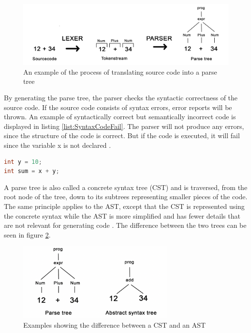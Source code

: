 \begin{figure}[H] 
    \begin{center}
        \includegraphics[width=1\textwidth]{Files/Billeder: Impl/parsing kopier.jpg}
    \end{center}
    \caption{An example of the process of translating source code into a parse tree}
    \label{I:Figure:ParsetreProcess}
\end{figure}

\noindent
By generating the parse tree, the parser checks the syntactic correctness of the source code. If the source code consists of syntax errors, error reports will be thrown. An example of syntactically correct but semantically incorrect code is displayed in listing \ref{list:SyntaxCodeFail}. The parser will not produce any errors, since the structure of the code is correct. But if the code is executed, it will fail since the variable x is not declared \cite{ParsingGuide}. 

\begin{lstlisting}[language = csharp, firstnumber=0, label={list:SyntaxCodeFail},caption=example of code with correct syntax but wrong semantics.]
int y = 10;
int sum = x + y;
\end{lstlisting}

\noindent
A parse tree is also called a concrete syntax tree (CST) and is traversed, from the root node of the tree, down to its subtrees representing smaller pieces of the code. The same principle applies to the AST, except that the CST is represented using the concrete syntax while the AST is more simplified and has fewer details that are not relevant for generating code \cite{ParsingGuide}. The difference between the two trees can be seen in figure \ref{I:Figure:ParseAST}. \\

\begin{figure}[H] 
    \begin{center}
        \includegraphics[width=0.7\textwidth]{Files/Billeder: Impl/parsetoAST.png}
    \end{center}
    \caption{Examples showing the difference between a CST and an AST}
    \label{I:Figure:ParseAST}
\end{figure}

